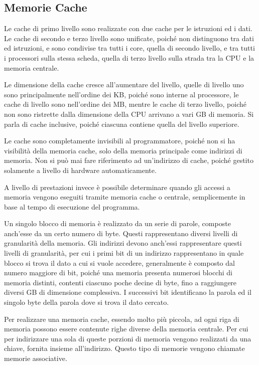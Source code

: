 \documentclass{article}
\numberwithin{equation}{subsection}
\begin{document}


\subsection{Memorie Cache}

Le cache di primo livello sono realizzate con due cache per le istruzioni ed i dati. Le cache di secondo e terzo livello sono unificate, poiché non distinguono tra dati ed 
istruzioni, e sono condivise tra tutti i core, quella di secondo livello, e tra tutti i processori sulla stessa scheda, quella di terzo livello sulla strada tra la CPU e la 
memoria centrale. 

Le dimensione della cache cresce all'aumentare del livello, quelle di livello uno sono principalmente nell'ordine dei KB, poiché sono interne al processore, le cache di 
livello sono nell'ordine dei MB, mentre le cache di terzo livello, poiché non sono ristrette dalla dimensione della CPU arrivano a vari GB di memoria. 
Si parla di cache inclusive, poiché ciascuna contiene quella del livello superiore. 

Le cache sono completamente invisibili al programmatore, poiché non si ha visibilità della memoria cache, solo della memoria principale come indirizzi di memoria. Non si 
può mai fare riferimento ad un'indirizzo di cache, poiché gestito solamente a livello di hardware automaticamente. 

A livello di prestazioni invece è possibile determinare quando gli accessi a memoria vengono eseguiti tramite memoria cache o centrale, semplicemente in base al tempo di 
esecuzione del programma. 


Un singolo blocco di memoria è realizzato da un serie di parole, composte anch'esse da un certo numero di byte. Questi rappresentano diversi livelli di granularità della memoria. 
Gli indirizzi devono anch'essi rappresentare questi livelli di granularità, per cui i primi bit di un indirizzo rappresentano in quale blocco si trova il dato a cui si vuole 
accedere, generalmente è composto dal numero maggiore di bit, poiché una memoria presenta numerosi blocchi di memoria distinti, contenti ciascuno poche decine di byte, fino 
a raggiungere diversi GB di dimensione complessiva. I successivi bit identificano la parola ed il singolo byte della parola dove si trova il dato cercato. 

Per realizzare una memoria cache, essendo molto più piccola, ad ogni riga di memoria possono essere contenute righe diverse della memoria centrale. Per cui per indirizzare una 
sola di queste porzioni di memoria vengono realizzati da una chiave, fornita insieme all'indirizzo. Questo tipo di memorie vengono chiamate memorie associative. 
\end{document}

